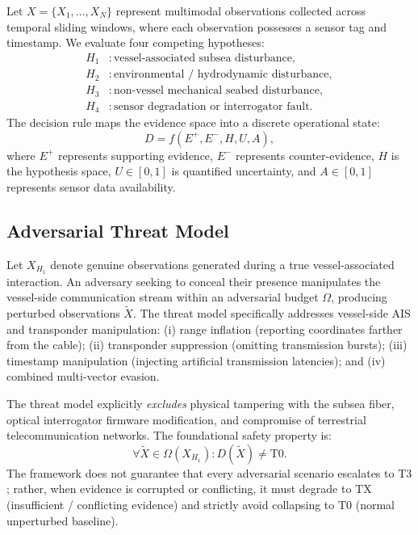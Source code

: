 \documentclass[conference]{IEEEtran}
\newcommand{\dstate}[1]{\ensuremath{\mathrm{#1}}}
\begin{document}
Let $X = \{X_1, \ldots, X_N\}$ represent multimodal observations collected
across temporal sliding windows, where each observation possesses a sensor tag
and timestamp. We evaluate four competing hypotheses:
\begin{align}
H_1&: \text{vessel-associated subsea disturbance}, \\
H_2&: \text{environmental / hydrodynamic disturbance}, \\
H_3&: \text{non-vessel mechanical seabed disturbance}, \\
H_4&: \text{sensor degradation or interrogator fault}.
\end{align}
The decision rule maps the evidence space into a discrete operational state:
\begin{equation}
D = f(E^{+}, E^{-}, H, U, A),
\end{equation}
where $E^{+}$ represents supporting evidence, $E^{-}$ represents counter-evidence,
$H$ is the hypothesis space, $U \in [0, 1]$ is quantified uncertainty, and
$A \in [0, 1]$ represents sensor data availability.

\subsection{Adversarial Threat Model}
Let $X_{H_1}$ denote genuine observations generated during a true
vessel-associated interaction. An adversary seeking to conceal their presence
manipulates the vessel-side communication stream within an adversarial budget
$\Omega$, producing perturbed observations $\tilde{X}$. The threat model
specifically addresses vessel-side AIS and transponder manipulation:
(i) range inflation (reporting coordinates farther from the cable);
(ii) transponder suppression (omitting transmission bursts); (iii) timestamp
manipulation (injecting artificial transmission latencies); and (iv) combined
multi-vector evasion.

The threat model explicitly \emph{excludes} physical tampering with the subsea
fiber, optical interrogator firmware modification, and compromise of terrestrial
telecommunication networks. The foundational safety property is:
\begin{equation}
\forall \tilde{X} \in \Omega(X_{H_1}): D(\tilde{X}) \neq \dstate{T0}.
\label{eq:safety}
\end{equation}
The framework does not guarantee that every adversarial scenario escalates to
\dstate{T3}; rather, when evidence is corrupted or conflicting, it must degrade
to \dstate{TX} (insufficient / conflicting evidence) and strictly avoid collapsing
to \dstate{T0} (normal unperturbed baseline).
\end{document}
